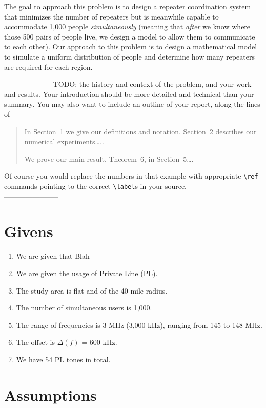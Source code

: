 \documentclass{icmmcm}
\begin{document}
The goal to approach this problem is to design a repeater coordination system that minimizes the number of repeaters but is meanwhile capable to accommodate 1,000 people \emph{simultaneously} (meaning that \emph{after} we know where those 500 pairs of people live, we design a model to allow them to communicate to each other). Our approach to this problem is to design a mathematical model to simulate a uniform distribution of people and determine how many repeaters are required for each region.

\noindent -------------------- TODO:
the history and context of the problem,
and your work and results.  Your introduction should be more detailed
and technical than your summary.  You may also want to include an
outline of your report, along the lines of
\begin{quotation}
  In Section~1 we give our definitions and notation. Section~2
  describes our numerical experiments\ldots{}..
  
  We prove our main result, Theorem~6, in Section~5\ldots{}.
\end{quotation}
Of course you would replace the numbers in that example with
appropriate \verb|\ref| commands pointing to the correct
\verb|\label|s in your source.\\
-----------------------

\section{Givens}
\begin{enumerate}
\item We are given that Blah
\item We are given the usage of Private Line (PL).
\item The study area is flat and of the 40-mile radius.
\item The number of simultaneous users is 1,000.
\item The range of frequencies is 3 MHz (3,000 kHz), ranging from 145 to 148 MHz.
\item The offset is $\Delta(f)$ = 600 kHz.
\item We have 54 PL tones in total.
\end{enumerate}

\section{Assumptions}
\end{document}
